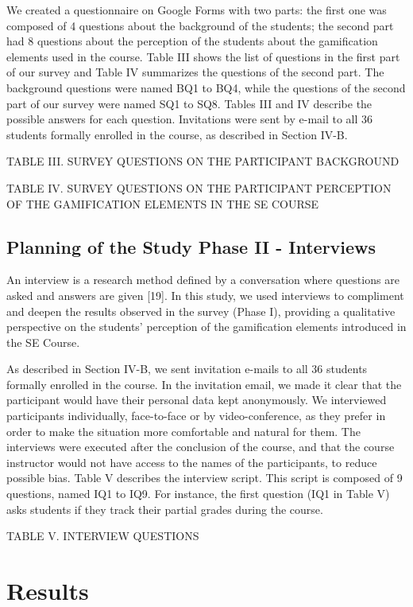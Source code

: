 We created a questionnaire on Google Forms  with two parts: the first one was composed of 4 questions about the background of the students; the second part had 8 questions about the perception of the students about the gamification elements used in the course. Table III shows the list of questions in the first part of our survey and Table IV summarizes the questions of the second part. The background questions were named BQ1 to BQ4, while the questions of the second part of our survey were named SQ1 to SQ8. Tables III and IV describe the possible answers for each question. Invitations were sent by e-mail to all 36 students formally enrolled in the course, as described in Section IV-B.

TABLE III. 	SURVEY QUESTIONS ON THE PARTICIPANT BACKGROUND

TABLE IV. 	SURVEY QUESTIONS ON THE PARTICIPANT PERCEPTION OF THE GAMIFICATION ELEMENTS  IN THE SE COURSE

\subsection{Planning of the Study Phase II - Interviews}

An interview is a research method defined by a conversation where questions are asked and answers are given [19]. In this study, we used interviews to compliment and deepen the results observed in the survey (Phase I), providing a qualitative perspective on the students’ perception of the gamification elements introduced in the SE Course.

As described in Section IV-B, we sent invitation e-mails to all 36 students formally enrolled in the course. In the invitation email, we made it clear that the participant would have their personal data kept anonymously. We interviewed participants individually, face-to-face or by video-conference, as they prefer in order to make the situation more comfortable and natural for them. The interviews were executed after the conclusion of the course, and that the course instructor would not have access to the names of the participants, to reduce possible bias. Table V describes the interview script. This script is composed of 9 questions, named IQ1 to IQ9. For instance, the first question (IQ1 in Table V) asks students if they track their partial grades during the course.

TABLE V. 	INTERVIEW QUESTIONS

\section{Results}

